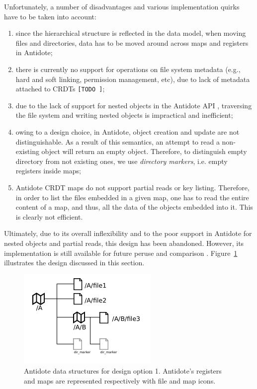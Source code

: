 \documentclass[11pt]{article}
\newcommand{\status}[1]{{\texttt{\footnotesize [#1]}}}
\begin{document}
Unfortunately, a number of disadvantages and various implementation quirks 
have to be taken into account:
\begin{enumerate}
\item since the hierarchical structure is reflected in the data model, 
when moving files and directories, data has to be moved around across maps and registers in Antidote;
\item there is currently no support for operations on file system metadata (e.g., hard and soft linking, 
permission management, etc), due to lack of metadata attached to CRDTs \status{TODO \cite{antidote-md}};
\item due to the lack of support for nested objects in the Antidote API \cite{antidote-nesting}, 
traversing the file system and writing nested objects is impractical and inefficient;
\item owing to a design choice, in Antidote, object creation and update are not distinguishable.
As a result of this semantics, an attempt to read a non-existing object will return an empty object.
Therefore, to distinguish empty directory from not existing ones, we use \textit{directory markers}, 
i.e. empty registers inside maps;
\item \label{partial-reads} Antidote CRDT maps do not support partial reads or key listing.
Therefore, in order to list the files embedded in a given map, 
one has to read the entire content of a map, and thus, all the data of the objects 
embedded into it. This is clearly not efficient.
\end{enumerate}

Ultimately, due to its overall inflexibility and to the poor support in Antidote 
for nested objects and partial reads, this design has been abandoned.
However, its implementation is still available for future peruse and comparison \cite{antidotefs-nesting}.
Figure~\ref{fig:design1} illustrates the design discussed in this section.

\begin{figure}
	\centering
	\includegraphics[scale=1.2]{design-1.pdf}
	\caption{Antidote data structures for design option 1. %
		Antidote's registers and maps are represented 
		respectively with file and map icons.}
	\label{fig:design1}
\end{figure}
\end{document}
